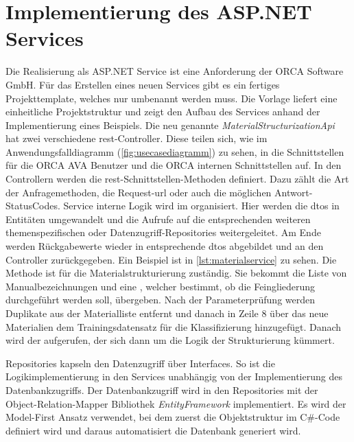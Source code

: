 \section{Implementierung des ASP.NET Services}
\label{c:implementation:service}
Die Realisierung als ASP.NET Service ist eine Anforderung der \glqq ORCA Software GmbH\grqq{}. Für das Erstellen eines neuen Services gibt es ein fertiges Projekttemplate, welches nur umbenannt werden muss. Die Vorlage liefert eine einheitliche Projektstruktur und zeigt den Aufbau des Services anhand der Implementierung eines Beispiels. Die neu genannte \textit{ MaterialStructurizationApi} hat zwei verschiedene \ac{rest}-Controller.
Diese teilen sich, wie im Anwendungsfalldiagramm (\autoref{fig:usecasediagramm}) zu sehen, in die Schnittstellen für die ORCA AVA Benutzer und die ORCA internen Schnittstellen auf. In den Controllern werden die \ac{rest}-Schnittstellen-Methoden definiert. Dazu zählt die Art der Anfragemethoden, die Request-\ac{url} oder auch die möglichen Antwort-StatusCodes. Service interne Logik wird im  organisiert. Hier werden die \acp{dto} in Entitäten umgewandelt und die Aufrufe auf die entsprechenden weiteren themenspezifischen  oder Datenzugriff-Repositories weitergeleitet. Am Ende werden Rückgabewerte wieder in entsprechende \acp{dto} abgebildet und an den Controller zurückgegeben. Ein Beispiel ist in \autoref{lst:materialservice} zu sehen. Die Methode ist für die Materialstrukturierung zuständig. Sie bekommt die Liste von Manualbezeichnungen und eine , welcher bestimmt, ob die Feingliederung durchgeführt werden soll, übergeben. Nach der Parameterprüfung werden Duplikate aus der Materialliste entfernt und danach in Zeile 8 über das  neue Materialien dem Trainingsdatensatz für die Klassifizierung hinzugefügt. Danach wird der  aufgerufen, der sich dann um die Logik der Strukturierung kümmert.

Repositories kapseln den Datenzugriff über Interfaces. So ist die Logikimplementierung in den Services unabhängig von der Implementierung des Datenbankzugriffs. Der Datenbankzugriff wird in den Repositories mit der Object-Relation-Mapper Bibliothek \textit{EntityFramework} implementiert. Es wird der Model-First Ansatz verwendet, bei dem zuerst die Objektstruktur im C\#-Code definiert wird und daraus automatisiert die Datenbank generiert wird.

